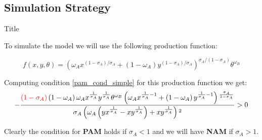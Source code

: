 \documentclass[notes,11pt, aspectratio=169]{beamer}
\newenvironment{wideitemize}{\itemize\addtolength{\itemsep}{10pt}}{\enditemize}
\begin{document}
\subsection{Simulation Strategy}
\begin{frame}{Title}
	\begin{wideitemize}
		
		\item{} To simulate the model we will use the following production function:

			\begin{equation}\label{prod_funct}
				f(x,y,\theta) = \left(\omega_{A} x^{\left(1-\sigma_{A}\right) / \sigma_{A}}+\left(1-\omega_{A}\right) y^{\left(1-\sigma_{A}\right) / \sigma_{A}}\right)^{\sigma_{A} /\left(1-\sigma_{A}\right)} \theta^{\omega_{B}}
			\end{equation}
	
		\item{}	Computing condition \ref{pam_cond_simple} for this production function we get:
				\begin{equation}
					-\frac{\textcolor{red}{\left(1-\sigma _A\right)} \left(1-\omega _A\right) \omega
					_A x^{\frac{1}{\sigma _A}} y^{\frac{1}{\sigma _A}} \theta
				^{\omega _B} \left(\omega _A x^{\frac{1}{\sigma
				_A}-1}+\left(1-\omega_A\right) y^{\frac{1}{\sigma
				_A}-1}\right){}^{\frac{\sigma _A}{1-\sigma _A}}}{\sigma _A
				\left(\omega _A \left(y x^{\frac{1}{\sigma _A}}-x
				y^{\frac{1}{\sigma _A}}\right)+x y^{\frac{1}{\sigma
				_A}}\right){}^2} > 0
				\end{equation}
	
		\item{} Clearly the condition for \textbf{PAM} holds if $\sigma_A < 1$ and we will have \textbf{NAM} if $\sigma_A > 1$.
		\end{wideitemize}
\end{frame}
\end{document}
